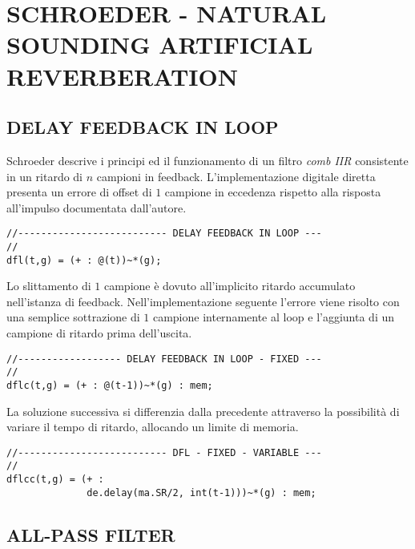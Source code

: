 \section*{SCHROEDER - NATURAL SOUNDING ARTIFICIAL REVERBERATION}

\subsection*{DELAY FEEDBACK IN LOOP}

Schroeder \cite{ms:62} descrive i principi ed il funzionamento di un filtro
\emph{comb IIR} consistente in un ritardo di $n$ campioni in feedback.
L'implementazione digitale diretta presenta un errore di offset di $1$ campione
in eccedenza rispetto alla risposta all'impulso documentata dall'autore.

\begin{lstlisting}
//-------------------------- DELAY FEEDBACK IN LOOP ---
//
dfl(t,g) = (+ : @(t))~*(g);
\end{lstlisting}

Lo slittamento di $1$ campione è dovuto all'implicito ritardo accumulato
nell'istanza di feedback. Nell'implementazione seguente l'errore viene risolto
con una semplice sottrazione di $1$ campione internamente al loop e l'aggiunta
di un campione di ritardo prima dell'uscita.

\begin{lstlisting}
//------------------ DELAY FEEDBACK IN LOOP - FIXED ---
//
dflc(t,g) = (+ : @(t-1))~*(g) : mem;
\end{lstlisting}

La soluzione successiva si differenzia dalla precedente attraverso la
possibilità di variare il tempo di ritardo, allocando un limite di memoria.

\begin{lstlisting}
//-------------------------- DFL - FIXED - VARIABLE ---
//
dflcc(t,g) = (+ :
              de.delay(ma.SR/2, int(t-1)))~*(g) : mem;
\end{lstlisting}

\subsection*{ALL-PASS FILTER}

